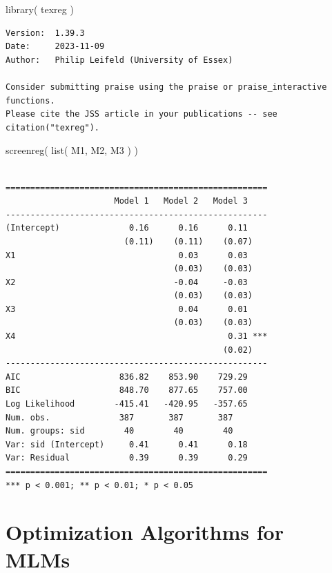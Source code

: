 \documentclass[
  letterpaper,
  DIV=11,
  numbers=noendperiod]{scrreprt}
\newenvironment{Shaded}{}{}
\newcommand{\FunctionTok}[1]{\textcolor[rgb]{0.02,0.16,0.49}{#1}}
\newcommand{\NormalTok}[1]{#1}
\begin{document}
\begin{Shaded}
\begin{Highlighting}[]
\FunctionTok{library}\NormalTok{( texreg )}
\end{Highlighting}
\end{Shaded}

\begin{verbatim}
Version:  1.39.3
Date:     2023-11-09
Author:   Philip Leifeld (University of Essex)

Consider submitting praise using the praise or praise_interactive functions.
Please cite the JSS article in your publications -- see citation("texreg").
\end{verbatim}

\begin{Shaded}
\begin{Highlighting}[]
\FunctionTok{screenreg}\NormalTok{( }\FunctionTok{list}\NormalTok{( M1, M2, M3 ) )}
\end{Highlighting}
\end{Shaded}

\begin{verbatim}

=====================================================
                      Model 1   Model 2   Model 3    
-----------------------------------------------------
(Intercept)              0.16      0.16      0.11    
                        (0.11)    (0.11)    (0.07)   
X1                                 0.03      0.03    
                                  (0.03)    (0.03)   
X2                                -0.04     -0.03    
                                  (0.03)    (0.03)   
X3                                 0.04      0.01    
                                  (0.03)    (0.03)   
X4                                           0.31 ***
                                            (0.02)   
-----------------------------------------------------
AIC                    836.82    853.90    729.29    
BIC                    848.70    877.65    757.00    
Log Likelihood        -415.41   -420.95   -357.65    
Num. obs.              387       387       387       
Num. groups: sid        40        40        40       
Var: sid (Intercept)     0.41      0.41      0.18    
Var: Residual            0.39      0.39      0.29    
=====================================================
*** p < 0.001; ** p < 0.01; * p < 0.05
\end{verbatim}

\chapter{Optimization Algorithms for
MLMs}\label{optimization-algorithms-for-mlms}
\end{document}
